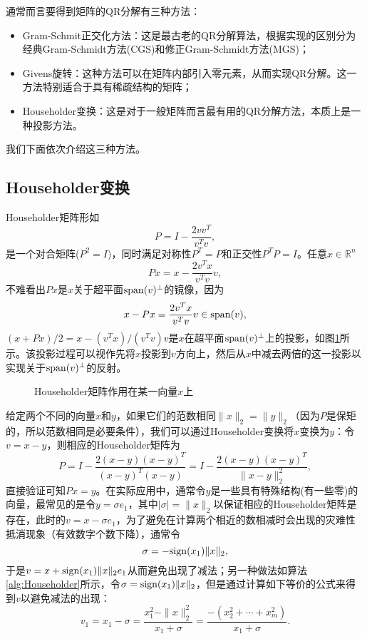 \documentclass[a4paper,10pt]{ctexart}
\begin{document}
通常而言要得到矩阵的QR分解有三种方法：
\begin{itemize}
    \item Gram-Schmit正交化方法：这是最古老的QR分解算法，根据实现的区别分为经典Gram-Schmidt方法(CGS)和修正Gram-Schmidt方法(MGS)；
    \item Givens旋转：这种方法可以在矩阵内部引入零元素，从而实现QR分解。这一方法特别适合于具有稀疏结构的矩阵；
    \item Householder变换：这是对于一般矩阵而言最有用的QR分解方法，本质上是一种投影方法。
\end{itemize}
我们下面依次介绍这三种方法。
\subsection{Householder变换}
Householder矩阵形如
\begin{equation}
    P = I - \frac{2vv^T}{v^T v},
\end{equation}
是一个对合矩阵($ P^2 = I $)，同时满足对称性$ P^T = P $和正交性$ P^T P = I $。任意$ x\in \mathbb{R}^n $
\[
    Px = x - \frac{2v^T x}{v^T v}v,
\]
不难看出$ Px $是$ x $关于超平面$ {\rm span}(v)^\perp $的镜像，因为
\[
    x - Px = \frac{2v^T x}{v^T v}v \in {\rm span}(v),
\]
$ (x + Px) / 2 = x - (v^T x)/(v^Tv)v $是$ x $在超平面$ {\rm span}(v)^\perp $上的投影，如图\ref{fig:Householder}所示。该投影过程可以视作先将$ x $投影到$ v $方向上，然后从$ x $中减去两倍的这一投影以实现关于$ {\rm span}(v)^\perp $的反射。
\begin{figure}[htpb]
    \centering
    \caption{Householder矩阵作用在某一向量$ x $上}
    \label{fig:Householder}
\end{figure}

给定两个不同的向量$ x $和$ y $，如果它们的范数相同$ \| x \|_2 = \| y \|_2 $（因为$ P $是保矩的，所以范数相同是必要条件），我们可以通过Householder变换将$ x $变换为$ y $：令$ v = x - y $，则相应的Householder矩阵为
\[
    P = I - \frac{2(x - y)(x - y)^T}{(x - y)^T(x - y)} = I - \frac{2(x - y)(x - y)^T}{\| x - y \|_2^2},
\]
直接验证可知$ Px = y $。在实际应用中，通常令$ y $是一些具有特殊结构(有一些零)的向量，最常见的是令$ y = \sigma e_1 $，其中$ |\sigma| = \| x \|_2 $以保证相应的Householder矩阵是存在，此时的$ v = x - \sigma e_1 $，为了避免在计算两个相近的数相减时会出现的灾难性抵消现象（有效数字个数下降），通常令
\[
    \sigma = - {\rm sign}(x_1) \| x \|_2,
\]
于是$ v = x + {\rm sign}(x_1) \| x \|_2 e_1 $从而避免出现了减法；另一种做法如算法\ref{alg:Householder}所示，令$ \sigma = {\rm sign}(x_1) \| x \|_2 $，但是通过计算如下等价的公式来得到$ v $以避免减法的出现：
\begin{equation}\label{eq:Householder}
    v_1 = x_1 - \sigma = \frac{x_1^2 - \| x \|_2^2}{x_1+\sigma} = \frac{-(x_2^2 + \cdots + x_m^2)}{x_1+\sigma}.
\end{equation}
\end{document}

